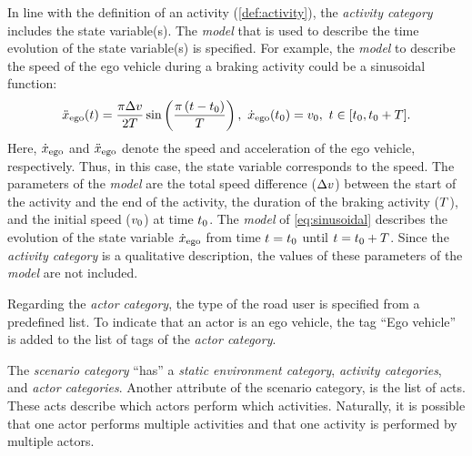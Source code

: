 In line with the definition of an activity (\cref{def:activity}), the \textit{activity category} includes the state variable(s).
The \textit{model} that is used to describe the time evolution of the state  variable(s) is specified. For example, the \textit{model} to describe the speed of the ego vehicle during a braking activity could be a sinusoidal function:
\begin{equation} \label{eq:sinusoidal}
	\egoacceleration(\time) = \frac{\pi \amplitude}{2\duration} \sin \left( \frac{\pi \left( \time - \inittime\right)}{\duration} \right),\ \egospeed(\inittime) = \egospeedinit,\ \time \in [\inittime, \inittime+\duration].
\end{equation}
Here, $\dot{x}_{\mathrm{ego}}$ and $\ddot{x}_{\mathrm{ego}}$ denote the speed and acceleration of the ego vehicle, respectively. Thus, in this case, the state variable corresponds to the speed. 
The parameters of the \textit{model} are the total speed difference ($\Delta v$) between the start of the activity and the end of the activity, the duration of the braking activity ($T$), and the initial speed ($v_{0}$) at time $t_{0}$. 
The \textit{model} of \cref{eq:sinusoidal} describes the evolution of the state variable $\dot{x}_{\mathrm{ego}}$ from time $t=t_{0}$ until $t=t_{0}+T$. Since the \textit{activity category} is a qualitative description, the values of these parameters of the \textit{model} are not included.

Regarding the \textit{actor category}, the type of the road user is specified from a predefined list. To indicate that an actor is an ego vehicle, the tag ``Ego vehicle'' is added to the list of tags of the \textit{actor category}.

The \textit{scenario category} ``has'' a \textit{static environment category}, \textit{activity categories}, and \textit{actor categories}. 
Another attribute of the scenario category, is the list of acts. %
These acts describe which actors perform which activities. Naturally, it is possible that one actor performs multiple activities and that one activity is performed by multiple actors.

